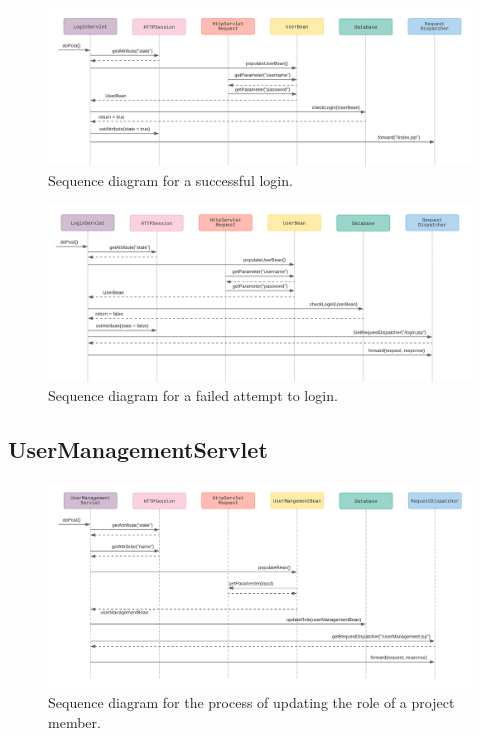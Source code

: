 \documentclass{article}
\begin{document}
\begin{figure}[H]
    \centering
    \includegraphics[scale=0.6]{images/successfulLogin.png}
    \caption{Sequence diagram for a successful login.}
    \label{fig:successfulLogin}
\end{figure}

\begin{figure}[H]
    \centering
    \includegraphics[scale=0.6]{images/failedLogin.png}
    \caption{Sequence diagram for a failed attempt to login.}
    \label{fig:failedLoginAttempt}
\end{figure}

\pagebreak
\subsection{UserManagementServlet}

\begin{figure}[H]
    \centering
    \includegraphics[scale=0.6]{images/updateRole.png}
    \caption{Sequence diagram for the process of updating the role of a project member.}
    \label{fig:successfulLogin}
\end{figure}
\end{document}
